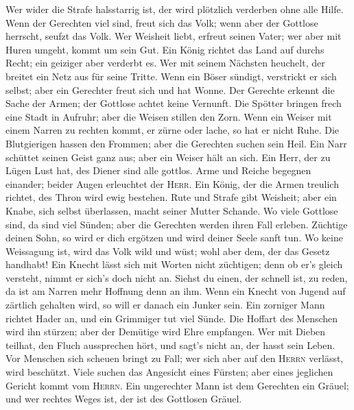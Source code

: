  Wer wider die Strafe halsstarrig ist, der wird plötzlich
verderben ohne alle Hilfe.  Wenn der Gerechten viel sind,
freut sich das Volk; wenn aber der Gottlose herrscht, seufzt das Volk.
 Wer Weisheit liebt, erfreut seinen Vater; wer aber mit
Huren umgeht, kommt um sein Gut.  Ein König richtet das
Land auf durchs Recht; ein geiziger aber verderbt es.  Wer
mit seinem Nächsten heuchelt, der breitet ein Netz aus für seine Tritte.
 Wenn ein Böser sündigt, verstrickt er sich selbst; aber
ein Gerechter freut sich und hat Wonne.  Der Gerechte
erkennt die Sache der Armen; der Gottlose achtet keine Vernunft.
 Die Spötter bringen frech eine Stadt in Aufruhr; aber die
Weisen stillen den Zorn.  Wenn ein Weiser mit einem Narren
zu rechten kommt, er zürne oder lache, so hat er nicht Ruhe.
 Die Blutgierigen hassen den Frommen; aber die Gerechten
suchen sein Heil.  Ein Narr schüttet seinen Geist ganz
aus; aber ein Weiser hält an sich.  Ein Herr, der zu
Lügen Lust hat, des Diener sind alle gottlos.  Arme und
Reiche begegnen einander; beider Augen erleuchtet der \textsc{Herr}.
 Ein König, der die Armen treulich richtet, des Thron
wird ewig bestehen.  Rute und Strafe gibt Weisheit; aber
ein Knabe, sich selbst überlassen, macht seiner Mutter Schande.
 Wo viele Gottlose sind, da sind viel Sünden; aber die
Gerechten werden ihren Fall erleben.  Züchtige deinen
Sohn, so wird er dich ergötzen und wird deiner Seele sanft tun.
 Wo keine Weissagung ist, wird das Volk wild und wüst;
wohl aber dem, der das Gesetz handhabt!  Ein Knecht lässt
sich mit Worten nicht züchtigen; denn ob er's gleich versteht, nimmt er
sich's doch nicht an.  Siehst du einen, der schnell ist,
zu reden, da ist am Narren mehr Hoffnung denn an ihm. 
Wenn ein Knecht von Jugend auf zärtlich gehalten wird, so will er danach
ein Junker sein.  Ein zorniger Mann richtet Hader an, und
ein Grimmiger tut viel Sünde.  Die Hoffart des Menschen
wird ihn stürzen; aber der Demütige wird Ehre empfangen. 
Wer mit Dieben teilhat, den Fluch aussprechen hört, und sagt's nicht an,
der hasst sein Leben.  Vor Menschen sich scheuen bringt
zu Fall; wer sich aber auf den \textsc{Herrn} verlässt, wird beschützt.
 Viele suchen das Angesicht eines Fürsten; aber eines
jeglichen Gericht kommt vom \textsc{Herrn}.  Ein
ungerechter Mann ist dem Gerechten ein Gräuel; und wer rechtes Weges
ist, der ist des Gottlosen Gräuel.

